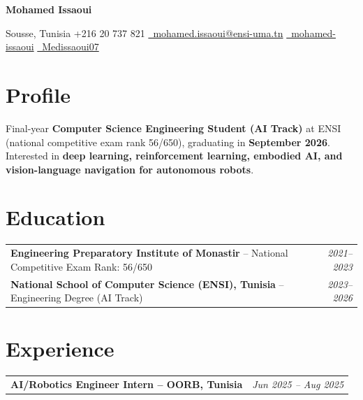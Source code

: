 \documentclass[10pt, letterpaper]{article}
\begin{document}
\begin{center}
    {\fontsize{22pt}{22pt}\bfseries Mohamed Issaoui}

    \vspace{0.1cm}

    {\small
    \faMapMarker* Sousse, Tunisia \quad
    \faPhone* +216 20 737 821 \quad
    \href{mailto:mohamed.issaoui@ensi-uma.tn}{\faEnvelope[regular] \ mohamed.issaoui@ensi-uma.tn} \quad
    \href{https://www.linkedin.com/in/mohamed-issaoui-/}{\faLinkedinIn \ mohamed-issaoui} \quad
    \href{https://github.com/Medissaoui07}{\faGithub \ Medissaoui07}
    }
\end{center}

\vspace{-0.3cm}

\section{Profile}
Final-year \textbf{Computer Science Engineering Student (AI Track)} at ENSI (national competitive exam rank 56/650), graduating in \textbf{September 2026}.  
Interested in \textbf{deep learning, reinforcement learning, embodied AI, and vision-language navigation for autonomous robots}.  


\section{Education}
\begin{tabularx}{\textwidth}{@{}Xr@{}}
\textbf{Engineering Preparatory Institute of Monastir} – National Competitive Exam Rank: 56/650 & \textit{2021–2023} \\
\textbf{National School of Computer Science (ENSI), Tunisia} – Engineering Degree (AI Track) & \textit{2023–2026} \\
\end{tabularx}

\section{Experience}

\begin{tabularx}{\textwidth}{@{}Xr@{}}
\textbf{AI/Robotics Engineer Intern – OORB, Tunisia} & \textit{Jun 2025 – Aug 2025} \\
\end{tabularx}
\end{document}
